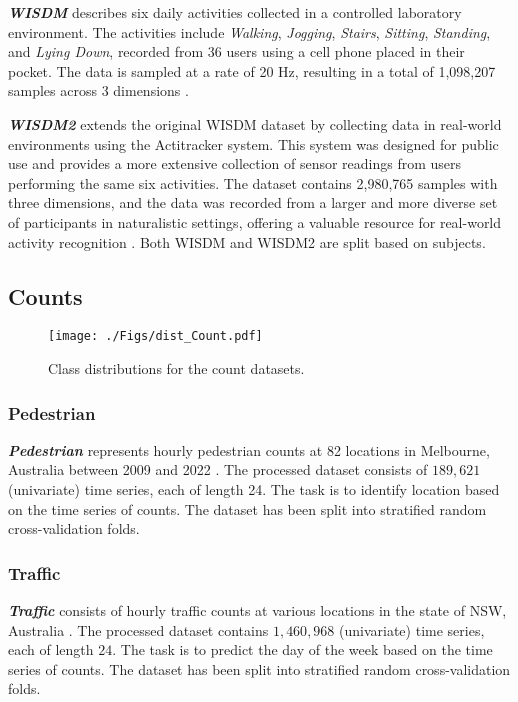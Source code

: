 \documentclass[twoside,11pt,preprint]{article}
\begin{document}
\textbf{\textit{WISDM}} describes six daily activities collected in a controlled laboratory environment. 
The activities include \textit{Walking}, \textit{Jogging}, \textit{Stairs}, \textit{Sitting}, \textit{Standing}, and \textit{Lying Down}, recorded from 36 users using a cell phone placed in their pocket. 
The data is sampled at a rate of 20 Hz, resulting in a total of 1,098,207 samples across 3 dimensions \citep{WISDM}.

\textbf{\textit{WISDM2}} extends the original WISDM dataset by collecting data in real-world environments using the Actitracker system. 
This system was designed for public use and provides a more extensive collection of sensor readings from users performing the same six activities. 
The dataset contains 2,980,765 samples with three dimensions, and the data was recorded from a larger and more diverse set of participants in naturalistic settings, offering a valuable resource for real-world activity recognition \citep{WISDM2}. Both WISDM and WISDM2 are split based on subjects.

\subsection{Counts}

\begin{figure}[h]%
    \centering%
    \texttt{[image: ./Figs/dist\_Count.pdf]}%
    \caption{Class distributions for the count datasets.}%
    \label{fig-class-dist-count}
\end{figure}%

\subsubsection{Pedestrian}

\textbf{\textit{Pedestrian}} represents hourly pedestrian counts at 82 locations in Melbourne, Australia between 2009 and 2022 \citep{data_pedestrian_2022}. The processed dataset consists of $189{,}621$ (univariate) time series, each of length 24. The task is to identify location based on the time series of counts. The dataset has been split into stratified random cross-validation folds.

\subsubsection{Traffic}

\textbf{\textit{Traffic}} consists of hourly traffic counts at various locations in the state of NSW, Australia \citep{data_traffic_2023}. The processed dataset contains $1{,}460{,}968$ (univariate) time series, each of length $24$. The task is to predict the day of the week based on the time series of counts. The dataset has been split into stratified random cross-validation folds.
\end{document}
